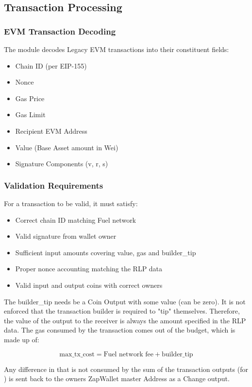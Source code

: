 \subsection{Transaction Processing}
\subsubsection{EVM Transaction Decoding}
The module decodes Legacy EVM transactions into their constituent fields:
\begin{itemize}
    \item Chain ID (per EIP-155)
    \item Nonce
    \item Gas Price
    \item Gas Limit
    \item Recipient EVM Address
    \item Value (Base Asset amount in Wei)
    \item Signature Components (v, r, s)
\end{itemize}

\subsubsection{Validation Requirements}
For a transaction to be valid, it must satisfy:
\begin{itemize}
    \item Correct chain ID matching Fuel network
    \item Valid signature from wallet owner
    \item Sufficient input amounts covering value, gas and builder\_tip
    \item Proper nonce accounting matching the RLP data
    \item Valid input and output coins with correct owners
\end{itemize}


The builder\_tip needs be a Coin Output with some value (can be zero). It is not enforced that the transaction builder
is required to "tip" themselves. Therefore, the value of the  output to the receiver is always the amount specified in the RLP
data. The gas consumed by the transaction comes out of the  budget, which is made up of:

\[
\text{max\_tx\_cost} = \text{Fuel network fee} + \text{builder\_tip}
\]

Any difference in  that is not consumed by the sum of the transaction outputs (for ) is sent back to the
owners ZapWallet master Address as a Change output.


